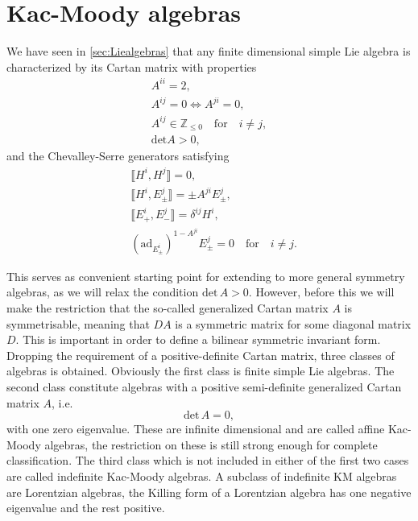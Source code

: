 \section{Kac-Moody algebras}\label{sec:KacMoody}
We have seen in \ref{sec:Liealgebras} that any finite dimensional simple Lie algebra is characterized by its Cartan matrix with properties 
\begin{equation}
    \begin{aligned}
        A^{ii} = 2,\\
        A^{ij} = 0 \Longleftrightarrow A^{ji} = 0,\\
        A^{ij}\in \mathbb{Z}_{\leq 0} \quad\text{for}\quad i\neq j,\\
        \text{det}A >0,
    \end{aligned}
\end{equation}
and the Chevalley-Serre generators satisfying 
\begin{equation}
\begin{aligned}\label{eq:ChevalleySerre2}
    &\llbracket H^i,H^j\rrbracket = 0,\\
    &\llbracket H^i,E_{\pm}^j\rrbracket = \pm A^{ji}E_{\pm}^{j},\\
    &\llbracket E_+^i,E_-^j\rrbracket = \delta^{ij}H^i,\\
    &(\text{ad}_{E_{\pm}^i})^{1-A^{ji}}E^j_\pm = 0 \quad \text{for} \quad i\neq j.
\end{aligned}
\end{equation}

This serves as convenient starting point for extending to more general symmetry algebras, as we will relax the condition $\text{det}\,A>0$. However, before this we will make the restriction that the so-called generalized Cartan matrix $A$ is symmetrisable, meaning that $DA$ is a symmetric matrix for some diagonal matrix $D$. This is important in order to define a bilinear symmetric invariant form. Dropping the requirement of a positive-definite Cartan matrix, three classes of algebras is obtained. Obviously the first class is finite simple Lie algebras. The second class constitute algebras with a positive semi-definite generalized Cartan matrix $A$, i.e.\
\begin{equation}
    \text{det}\, A = 0,
\end{equation}
with one zero eigenvalue. These are infinite dimensional and are called affine Kac-Moody algebras, the restriction on these is still strong enough for complete classification. The third class which is not included in either of the first two cases are called indefinite Kac-Moody algebras. A subclass of indefinite KM algebras are Lorentzian algebras, the Killing form of a Lorentzian algebra has one negative eigenvalue and the rest positive. 

